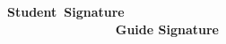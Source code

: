 \documentclass[12pt]{article}
\renewcommand{\_}{\kern-1.5pt\textunderscore\kern-1.5pt}
\begin{document}

 \par

 \par


\vspace{\baselineskip}

\vspace{\baselineskip}
{\fontsize{14pt}{16.8pt}\selectfont \textbf{Student\ Signature\ \ \ \ \ \ \ \ \ \ \ \ \ \ \ \ \ \ \ \ \ \ \ \ \ \ \ \ \ \ \ \ \ \ \ \ \ \ \ \ \ \ \ \ \ \ \ \ \ \ \ \ \ \ \ \ \ \ \ \ \   Guide Signature}\par}\par

\begin{justify}
 
\end{justify}\par


\vspace{\baselineskip}
\end{document}
